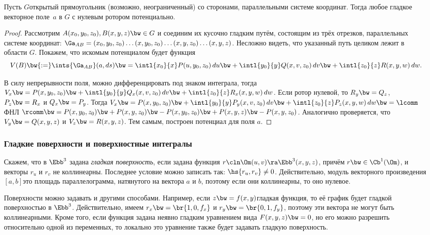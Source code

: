 \documentclass[a4paper]{article}
\begin{document}
\begin{theorem}
Пусть $G$\т открытый прямоугольник (возможно, неограниченный) со сторонами, параллельными системе координат.
Тогда любое гладкое векторное поле~$a$ в $G$ с нулевым ротором потенциально.
\end{theorem}
\begin{proof}
Рассмотрим $A(x_0,y_0,z_0), B(x,y,z) \bw\in G$ и соединим их кусочно гладким путём, состоящим из трёх отрезков,
параллельных системе координат: $\Ga_{AB} =(x_0,y_0,z_0)\dots(x,y_0,z_0)\dots(x,y,z_0)\dots(x,y,z)$. Несложно видеть,
что указанный путь целиком лежит в области $G$. Покажем, что искомым потенциалом будет функция
$$V(B) \bw{:=} \ints{\Ga_{AB}}(a,ds) \bw= \intl{x_0}{x}P(u,y_0,z_0)\,du
\bw+ \intl{y_0}{y}Q(x,v,z_0)\,d v \bw+ \intl{z_0}{z}R(x,y,w)\,dw.$$

В силу непрерывности поля, можно дифференцировать под знаком интеграла, тогда $V_x \bw= P(x,y_0,z_0) \bw+
\intl{y_0}{y}Q_x(x,v,z_0)\,d v \bw+ \intl{z_0}{z}R_x(x,y,w)\,d w$. Если ротор нулевой, то $R_y\bw=Q_z$,
$P_z\bw=R_x$ и $Q_x \bw= P_y$. Тогда $V_x \bw= P(x,y_0,z_0) \bw+ \intl{y_0}{y}P_y(x,v,z_0)\,d v \bw+
\intl{z_0}{z}P_z(x,y,w) \,d w \bw= \lcomm$ ФНЛ $\rcomm \bw= P(x,y_0,z_0) \bw+ P(x,y,z_0)\bw-P(x,y_0,z_0) \bw+
P(x,y,z)\bw-P(x,y,z_0)$. Аналогично проверяется, что $V_y \bw= Q(x,y,z)$ и $V_z \bw= R(x,y,z)$.
Тем самым, построен потенциал для поля $a$.
\end{proof}

\subsubsection{Гладкие поверхности и поверхностные интегралы}

\begin{df}
Скажем, что в $\Ebb^3$ задана \emph{гладкая поверхность}, если задана функция
$r\cln \Om(u,v) \ra \Ebb^3(x,y,z)$, причём $r \bw\in \Cb^1(\Om)$, и
векторы $r_u$ и $r_v$ не коллинеарны. Последнее условие можно записать так: $\hs{r_u, r_v} \neq 0$.
Действительно, модуль векторного произведения $[a,b]$\т это площадь параллелограмма, натянутого
на вектора $a$ и $b$, поэтому если они коллинеарны, то оно нулевое.
\end{df}

Поверхности можно задавать и другими способами. Например, если $z \bw= f(x,y)$\т гладкая функция,
то её график будет гладкой поверхностью в $\Ebb^3$. Действительно, имеем
$r_x \bw= \br{1, 0, f_x}$ и $r_y \bw= \br{0, 1, f_y}$, поэтому эти вектора не могут быть коллинеарными.
Кроме того, если функция задана неявно гладким уравнением вида $F(x,y,z)\bw= 0$, но его можно
разрешить относительно одной из переменных,
то локально это уравнение также будет задавать гладкую поверхность.
\end{document}
